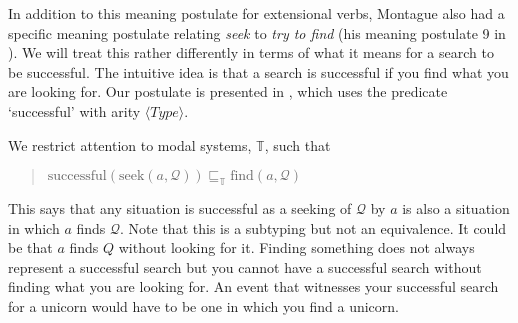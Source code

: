 In addition to this meaning postulate for extensional verbs, Montague
also had a specific meaning postulate relating \textit{seek} to
\textit{try to find} (his meaning postulate 9 in
\citealp{Montague1973}).  We will treat this rather differently in
terms of what it means for a search to be successful.  The intuitive
idea is that a search is successful if you find what you are looking
for.  Our postulate is presented in \nexteg{}, which uses the
predicate `successful' with arity $\langle\textit{Type}\rangle$.
\begin{ex}
  We restrict attention to modal systems, $\mathbb{T}$, such that
  \begin{quote}
    $\text{successful}(\text{seek}(a,\mathcal{Q}))\sqsubseteq_{\mathbb{T}}
    \text{find}(a,\mathcal{Q})$
  \end{quote}
\label{ex:mp-seek}
\end{ex} 
This says that any situation is successful as a seeking of
$\mathcal{Q}$ by $a$ is also a situation in which $a$ finds $\mathcal{Q}$.%
Note that
this is a subtyping but not an equivalence.  It could be that $a$
finds $Q$ without looking for it.  Finding something does not always
represent a successful search but you cannot have a successful search
without finding what you are looking for.  An event that witnesses
your successful search for a unicorn would have to be one in which you
find a unicorn.

